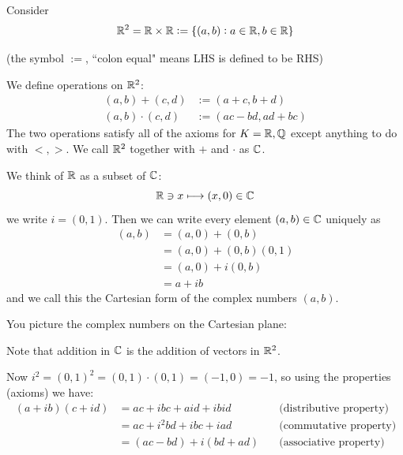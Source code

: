 \documentclass[10pt]{scrartcl}
\begin{document}


Consider 
\[\mathbb{R}^2 = \mathbb{R} \times \mathbb{R}:= \{(a,b): a \in\mathbb{R}, b\in\mathbb{R}\}\]

(the symbol $:=$, ``colon equal" means LHS is defined to be RHS)\\

\begin{definition} We define operations on $\mathbb{R}^2$: 
\[
\begin{aligned}
  (a,b) + (c,d) &:= (a+c,b+d)\\
  (a,b) \cdot (c,d) &:= (ac-bd, ad+bc)
\end{aligned}
\]
The two operations satisfy all of the axioms for $K = \mathbb{R}, \mathbb{Q}$ except anything to do with $<, >$. We call $\mathbb{R}^2$ together with $+$ and $\cdot$ as $\mathbb{C}$. 
\end{definition}

We think of $\mathbb{R}$ as a subset of $\mathbb{C}$: 
\[\mathbb{R} \ni x \longmapsto (x,0) \in \mathbb{C}\]
we write $i = (0,1)$. Then we can write every element $(a,b) \in\mathbb{C}$ uniquely as
\[
\begin{aligned}
  (a,b) &= (a,0) + (0,b)\\ 
  &= (a,0) + (0,b)(0,1)\\
  &= (a,0) + i(0,b)\\
  &= a + ib
\end{aligned}
\]
and we call this the Cartesian form of the complex numbers $(a,b)$. 

You picture the complex numbers on the Cartesian plane: 

\begin{center}
\end{center}

Note that addition in $\mathbb{C}$ is the addition of vectors in $\mathbb{R}^2$. 

Now $i^2 = (0,1)^2 = (0,1)\cdot (0,1) = (-1,0) = -1$, so using the properties (axioms) we have: 
\[
\begin{aligned}
   (a+ib)(c+id) &= ac +ibc + aid + ibid &\quad\text{(distributive property)}\\
   &= ac + i^2bd + ibc + iad &\quad\text{(commutative property)}\\
   &= (ac - bd) + i(bd + ad) &\quad\text{(associative property)}
\end{aligned}
\]
\end{document}
